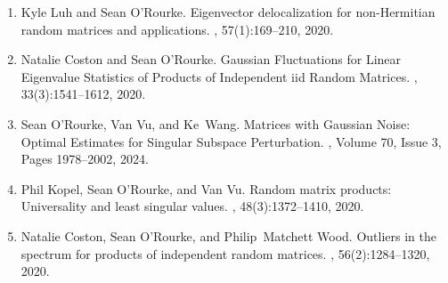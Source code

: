 \documentclass[letterpaper]{article}
\begin{document}
\begin{enumerate}
	\item Kyle Luh and Sean O'Rourke.
	\newblock Eigenvector delocalization for non-{H}ermitian random matrices and applications.
	, 57(1):169--210, 2020.  
	\item Natalie Coston and Sean O'Rourke.
	\newblock Gaussian {F}luctuations for {L}inear {E}igenvalue {S}tatistics of {P}roducts of {I}ndependent iid {R}andom {M}atrices.
	, 33(3):1541--1612, 2020.  
	\item Sean O'Rourke, Van Vu, and Ke~Wang.
	\newblock Matrices with Gaussian Noise: Optimal Estimates for Singular Subspace Perturbation. 
	, Volume 70, Issue 3, Pages 1978--2002, 2024.
	\item Phil Kopel, Sean O'Rourke, and Van Vu.
	\newblock Random matrix products: Universality and least singular values.
	, 48(3):1372--1410, 2020.
	\item Natalie Coston, Sean O'Rourke, and Philip~Matchett Wood.
	\newblock Outliers in the spectrum for products of independent random matrices.
	, 56(2):1284--1320, 2020.

\end{enumerate}
\end{document}
